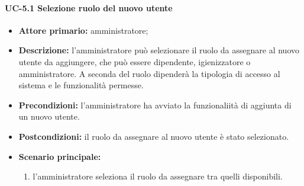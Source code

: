    \paragraph{UC-5.1 Selezione ruolo del nuovo utente}
    \begin{itemize}
        \item \textbf{Attore primario:} amministratore; 
    
        \item \textbf{Descrizione:} l'amministratore può selezionare il ruolo da assegnare al nuovo utente da aggiungere, che può essere dipendente, igienizzatore o amministratore. A seconda del ruolo dipenderà la tipologia di accesso al sistema e le funzionalità permesse.
    
        \item \textbf{Precondizioni:} l'amministratore ha avviato la funzionaliità di aggiunta di un nuovo utente.
    
        \item \textbf{Postcondizioni:} il ruolo da assegnare al nuovo utente è stato selezionato.
    
        \item \textbf{Scenario principale:}
              \begin{enumerate}
                  \item l'amministratore seleziona il ruolo da assegnare tra quelli disponibili.
              \end{enumerate}
    \end{itemize}

